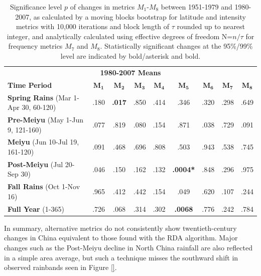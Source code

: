 \begin{table}[p]

\centering

\caption{Significance level $p$ of changes in metrics $M_1$-$M_8$ between 1951-1979 and 1980-2007, as calculated by a moving blocks bootstrap for latitude and intensity metrics with 10,000 iterations and block length of $\tau$ rounded up to nearest integer, and analytically calculated using effective degrees of freedom N=$n/\tau$ for frequency metrics $M_7$ and $M_8$. Statistically significant changes at the 95\%/99\% level are indicated by bold/asterisk and bold.}

\begin{tabular}{ l c c c c c c c c}
	 \multicolumn{9}{c}{\textbf{1980-2007 Means}} \\
	 \textbf{Time Period} 						& $\boldsymbol{M_1}$ & $\boldsymbol{M_2}$ & $\boldsymbol{M_3}$ & $\boldsymbol{M_4}$ & $\boldsymbol{M_5}$ & $\boldsymbol{M_6}$ & $\boldsymbol{M_7}$ & $\boldsymbol{M_8}$ \\	 \hline
	 \hline
	\textbf{Spring Rains} (Mar 1-Apr 30, 60-120) 	& .180 & \textbf{.017} 	& .850 & .414 	& .346 			& .320 & .298 & .649 \\
	\textbf{Pre-Meiyu} (May 1-Jun 9, 121-160) 		& .077 & .819 			& .080 & .154 & .871 			& .038 & .729 & .091 \\		
	\textbf{Meiyu} (Jun 10-Jul 19, 161-120) 		& .091 & .468 			& .696 & .808 & .503 			& .943 & .538 & .745 \\
	\textbf{Post-Meiyu} (Jul 20-Sep 30) 			& .046 & .150 			& .162 & .132 & \textbf{.0004*} 	& .848 & .296 & .975 \\
	\textbf{Fall Rains} (Oct 1-Nov 16) 				& .965 & .412 			& .442 & .154 & .049 			& .620 & .107 & .244 \\
	\textbf{Full Year} (1-365)	 				& .726 & .068 			& .314 & .302 & \textbf{.0068} 	& .776 & .242 & .784 \\
	
\end{tabular}
\label{ts12}
\end{table}

In summary, alternative metrics do not consistently show twentieth-century changes in China equivalent to those found with the RDA algorithm. Major changes such as the Post-Meiyu decline in North China rainfall are also reflected in a simple area average, but such a technique misses the southward shift in observed rainbands seen in Figure \ref{}. 

